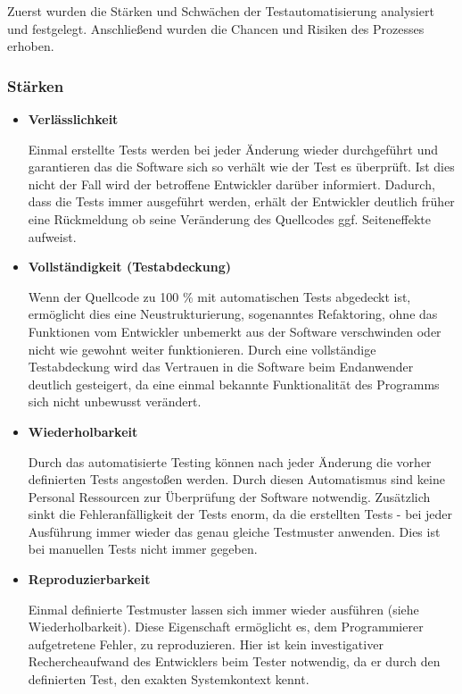 Zuerst wurden die Stärken und Schwächen der Testautomatisierung analysiert und festgelegt. Anschließend wurden die Chancen und Risiken des Prozesses erhoben. 
\subsubsection{Stärken}
\begin{itemize}	
	\item \textbf{Verlässlichkeit}
	
	Einmal erstellte Tests werden bei jeder Änderung wieder durchgeführt und garantieren das die Software sich so verhält wie der Test es überprüft. Ist dies nicht der Fall wird der betroffene Entwickler darüber informiert. Dadurch, dass die Tests immer ausgeführt werden, erhält der Entwickler deutlich früher eine Rückmeldung ob seine Veränderung des Quellcodes ggf. Seiteneffekte aufweist.
	
	\item \textbf{Vollständigkeit (Testabdeckung)}
	
	Wenn der Quellcode zu 100 \% mit automatischen Tests abgedeckt ist, ermöglicht dies eine Neustrukturierung, sogenanntes Refaktoring, ohne das Funktionen vom Entwickler unbemerkt aus der Software verschwinden oder nicht wie gewohnt weiter funktionieren. Durch eine vollständige Testabdeckung wird das Vertrauen in die Software beim Endanwender deutlich gesteigert, da eine einmal bekannte Funktionalität des Programms sich nicht unbewusst verändert.
	
	\item \textbf{Wiederholbarkeit}
	
	Durch das automatisierte Testing können nach jeder Änderung die vorher definierten Tests angestoßen werden. Durch diesen Automatismus sind keine Personal Ressourcen zur Überprüfung der Software notwendig. Zusätzlich sinkt die Fehleranfälligkeit der Tests enorm, da die erstellten Tests - bei jeder Ausführung immer wieder das genau gleiche Testmuster anwenden. Dies ist bei manuellen Tests nicht immer gegeben.
	
	\item \textbf{Reproduzierbarkeit}
	
	Einmal definierte Testmuster lassen sich immer wieder ausführen (siehe Wiederholbarkeit). Diese Eigenschaft ermöglicht es, dem Programmierer aufgetretene Fehler, zu reproduzieren. Hier ist kein investigativer Rechercheaufwand des Entwicklers beim Tester notwendig, da er durch den definierten Test, den exakten Systemkontext kennt.
	

\end{itemize}

